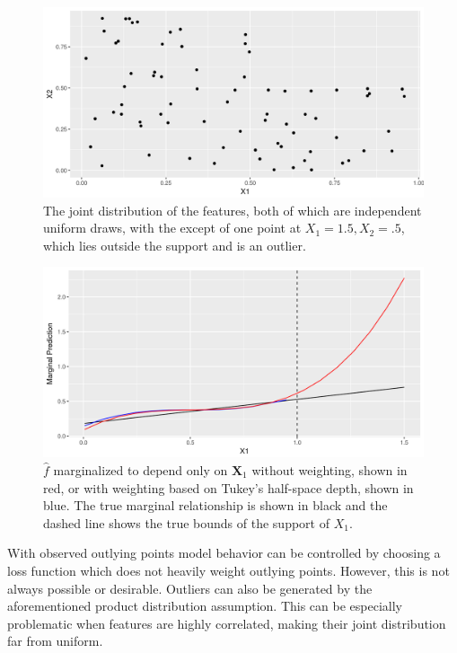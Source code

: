 \begin{figure}
  \includegraphics[width=\textwidth]{mp_w_data.png}
  \caption{The joint distribution of the features, both of which are independent uniform draws, with the except of one point at $X_1 = 1.5, X_2 = .5$, which lies outside the support and is an outlier.\label{figure:mp_w_data}}
\end{figure}

\begin{figure}
  \includegraphics[width=\textwidth]{mp_w.png}
  \caption{$\hat{f}$ marginalized to depend only on $\mathbf{X}_1$ without weighting, shown in red, or with weighting based on Tukey's half-space depth, shown in blue. The true marginal relationship is shown in black and the dashed line shows the true bounds of the support of $X_1$. \label{figure:mp_w}}
\end{figure}

With observed outlying points model behavior can be controlled by choosing a loss function which does not heavily weight outlying points. However, this is not always possible or desirable. Outliers can also be generated by the aforementioned product distribution assumption. This can be especially problematic when features are highly correlated, making their joint distribution far from uniform.







\address{Zachary M. Jones\\
  Pennsylvania State University\\
  University Park, Pennsylvania\\
  United States\\}
